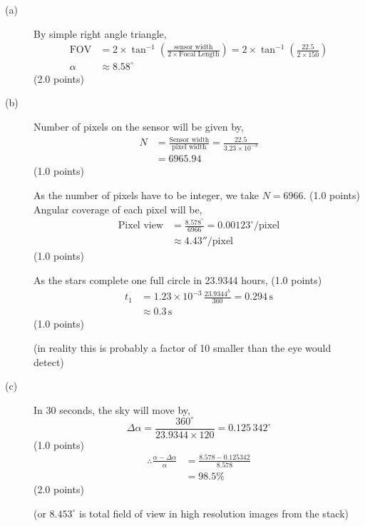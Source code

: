 \begin{description}
\item[(a)] By simple right angle triangle,
\begin{align*}
\mathrm{FOV} &= 2 \times \tan^{-1}
  \left(\frac{\text{sensor width}}{2 \times \text{Focal Length}}\right)
  = 2 \times \tan^{-1}\left(\frac{22.5}{2 \times 150}\right) \\
\alpha &\approx 8.58^\circ
\end{align*}
\hfill(2.0 points)

\item[(b)] Number of pixels on the sensor will be given by,
\begin{align*}
N &= \frac{\text{Sensor width}}{\text{pixel width}}
   = \frac{22.5}{3.23 \times 10^{-3}} \\
  &= 6965.94
\end{align*}
\hfill(1.0 points)

As the number of pixels have to be integer, we take $N = 6966$.
\hfill(1.0 points)\\
Angular coverage of each pixel will be,
\begin{align*}
\text{Pixel view} &= \frac{8.578^\circ}{6966} = 0.00123^\circ/\text{pixel} \\
  &\approx 4.43''/\text{pixel}
\end{align*}
\hfill(1.0 points)

As the stars complete one full circle in 23.9344 hours, \hfill(1.0 points)
\begin{align*}
t_1 &= 1.23 \times 10^{-3}\,\frac{23.9344^{h}}{360} = 0.294\,\mathrm{s} \\
  &\approx 0.3\,\mathrm{s}
\end{align*}
\hfill(1.0 points)

(in reality this is probably a factor of 10 smaller than the eye would
detect)

\item[(c)] In 30 seconds, the sky will move by,
\[ \Delta\alpha = \frac{360^\circ}{23.9344 \times 120} = 0.125\,342^\circ \]
\hfill(1.0 points)
\begin{align*}
\therefore \frac{\alpha - \Delta\alpha}{\alpha}
  &= \frac{8.578 - 0.125342}{8.578} \\
  &= 98.5\%
\end{align*}
\hfill(2.0 points)

(or $8.453^\circ$ is total field of view in high resolution images from the
stack)
\end{description}

